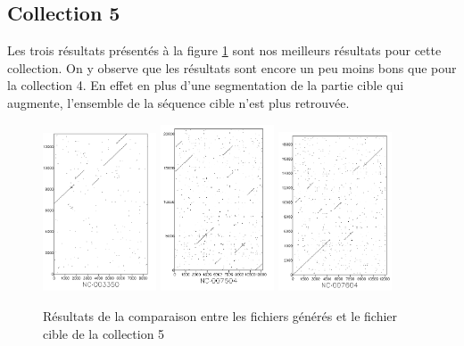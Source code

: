 \documentclass[12pt,a4paper,final]{article}
\begin{document}
\subsection{Collection 5}
Les trois résultats présentés à la figure \ref{coll5} sont nos meilleurs résultats pour cette collection. On y observe que les résultats sont encore un peu moins bons que pour la collection 4. En effet en plus d'une segmentation de la partie cible qui augmente, l'ensemble de la séquence cible n'est plus retrouvée.

\begin{figure}[!ht]
	\centering
	\includegraphics[width=0.3\textwidth]{images/collection5/collection5_1.png}
	\includegraphics[width=0.3\textwidth]{images/collection5/collection5_3.png}
	\includegraphics[width=0.3\textwidth]{images/collection5/collection5_9.png}
	\caption{\label{coll5}Résultats de la comparaison entre les fichiers générés et le fichier cible de la collection 5}
\end{figure}
\end{document}
